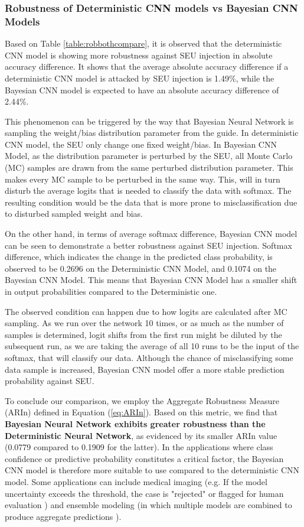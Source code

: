 \subsubsection{Robustness of Deterministic CNN models vs Bayesian CNN Models}

Based on Table \ref{table:robbothcompare}, it is observed that the deterministic CNN model is showing more robustness against SEU injection in absolute accuracy difference. It shows that the average absolute accuracy difference if a deterministic CNN model is attacked by SEU injection is 1.49\%, while the Bayesian CNN model is expected to have an absolute accuracy difference of 2.44\%. 

This phenomenon can be triggered by the way that Bayesian Neural Network is sampling the weight/bias distribution parameter from the guide. In deterministic CNN model, the SEU only change one fixed weight/bias. In Bayesian CNN Model, as the distribution parameter is perturbed by the SEU, all Monte Carlo (MC) samples are drawn from the same perturbed distribution parameter. This makes every MC sample to be perturbed in the same way. This, will in turn disturb the average logits that is needed to classify the data with softmax. The resulting condition would be the data that is more prone to misclassification due to disturbed sampled weight and bias.

On the other hand, in terms of average softmax difference, Bayesian CNN model can be seen to demonstrate a better robustness against SEU injection. Softmax difference, which indicates the change in the predicted class probability, is observed to be 0.2696 on the Deterministic CNN Model, and 0.1074 on the Bayesian CNN Model. This means that Bayesian CNN Model has a smaller shift in output probabilities compared to the Deterministic one. 

The observed condition can happen due to how logits are calculated after MC sampling. As we run over the network 10 times, or as much as the number of samples is determined, logit shifts from the first run might be diluted by the subsequent run, as we are taking the average of all 10 runs to be the input of the softmax, that will classify our data. Although the chance of misclassifying some data sample is increased, Bayesian CNN model offer a more stable prediction probability against SEU.

To conclude our comparison, we employ the Aggregate Robustness Measure (ARIn) defined in Equation (\ref{eq:ARIn}). Based on this metric, we find that \textbf{Bayesian Neural Network exhibits greater robustness than the Deterministic Neural Network}, as evidenced by its smaller ARIn value (0.0779 compared to 0.1909 for the latter). In the applications where class confidence or predictive probability constitutes a critical factor, the Bayesian CNN model is therefore more suitable to use compared to the deterministic CNN model. Some applications can include medical imaging (e.g. If the model uncertainty exceeds the threshold, the case is "rejected" or flagged for human evaluation \cite{10.3389/fninf.2024.1346723} ) and ensemble modeling (in which multiple models are combined to produce aggregate predictions \cite{bishopbarber98}). 


